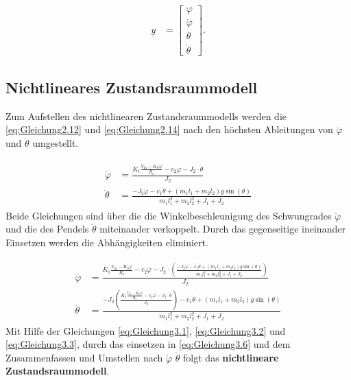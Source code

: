 \begin{align}
    \underline{y} &=
    \begin{bmatrix} \label{eq:Gleichung3.4}
        \varphi     \\
        \dot\varphi \\
        \theta      \\
        \dot\theta
    \end{bmatrix}.
\end{align}

\subsection{Nichtlineares Zustandsraummodell}

Zum Aufstellen des nichtlinearen Zustandsraummodells werden die \autoref{eq:Gleichung2.12} und \autoref{eq:Gleichung2.14} nach den höchsten Ableitungen von $\ddot\varphi$ und $\ddot\theta$ umgestellt.

\begin{align} \label{eq:Gleichung3.5}
    \begin{split}
        \ddot\varphi &= \frac{K_{\mathrm{t}} \frac{V_{\mathrm{m}} - K_{\mathrm{b}} \dot\varphi}{R_{\mathrm{a}}} - c_2 \dot\varphi - J_2 \cdot \ddot\theta}{J_2} \\
        \ddot\theta &= \frac{-J_2 \ddot\varphi - c_1 \dot\theta + \left( m_1 l_1 + m_2 l_2\right) g \sin(\theta)}{m_1 l_1^2 + m_2 l_2^2 + J_1 + J_2}
    \end{split}
\end{align}
\newline
Beide Gleichungen sind über die die Winkelbeschleunigung des Schwungrades $\ddot\varphi$ und die des Pendels $\ddot\theta$ miteinander verkoppelt. Durch das gegenseitige ineinander Einsetzen werden die Abhängigkeiten eliminiert.

\begin{align} \label{eq:Gleichung3.6}
    \begin{split}
        \ddot\varphi &= \frac{K_{\mathrm{t}} \frac{V_{\mathrm{m}} - K_{\mathrm{b}} \dot\varphi}{R_{\mathrm{a}}} - c_2 \dot\varphi - J_2 \cdot \left( \frac{-J_2 \ddot\varphi - c_1 \dot\theta + \left( m_1 l_1 + m_2 l_2\right) g \sin(\theta)}{m_1 l_1^2 + m_2 l_2^2 + J_1 + J_2}\right)}{J_2} \\
        \ddot\theta &= \frac{-J_2 \left( \frac{K_{\mathrm{t}} \frac{V_{\mathrm{m}} - K_{\mathrm{b}} \dot\varphi}{R_{\mathrm{a}}} - c_2 \dot\varphi - J_2 \cdot \ddot\theta}{J_2}\right) - c_1 \dot\theta + \left( m_1 l_1 + m_2 l_2\right) g \sin(\theta)}{m_1 l_1^2 + m_2 l_2^2 + J_1 + J_2}
    \end{split}
\end{align}
\newline
Mit Hilfe der Gleichungen \ref{eq:Gleichung3.1}, \ref{eq:Gleichung3.2} und \ref{eq:Gleichung3.3}, durch das einsetzen in \autoref{eq:Gleichung3.6} und dem Zusammenfassen und Umstellen nach $\ddot\varphi$ \bzw $\ddot\theta$ folgt das \textbf{nichtlineare Zustandsraummodell}.

